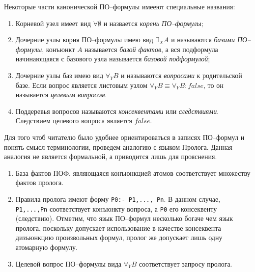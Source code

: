 Некоторые части канонической ПО--формулы имееют специальные названия:
\begin{enumerate}
\item Корневой узел имеет вид $\forall \emptyset$ и назвается {\em корень ПО--формулы}; 

\item Дочерние узлы корня ПО--формулы имею вид $\exists_XA$ и называются {\em базами ПО--формулы}, конъюнкт $A$ называется {\em базой фактов}, а вся подформула начинающаяся с базового узла называется {\em базовой подформулой};

\item Дочерние узлы баз имею вид $\forall_YB$ и называются {\em вопросами} к родительской базе. Если вопрос является листовым узлом $\forall_YB \equiv \forall_YB\colon false$, то он называется {\em целевым вопросом}. %

\item Поддеревья вопросов называются {\em консеквентами} или {\em следствиями}. Следствием целевого вопроса является $false$. 

\end{enumerate}


Для того чтоб читателю было удобнее ориентироваться в записях ПО--формул и понять смысл терминологии, проведем аналогию с языком Пролога. Данная аналогия не является формальной, а приводится лишь для прояснения.

\begin{enumerate} 
\item База фактов ПОФ, являющаяся конъюнкцией атомов соответствует множеству фактов пролога.
\item Правила пролога имеют форму \texttt{P0:- P1,..., Pn}. В данном случае, \texttt{P1,...,Pn} соответствует конъюнкту вопроса, а \texttt{P0} его консеквенту (следствию). Отметим, что язык ПО--формул несколько богаче чем язык пролога, поскольку допускает использование в качестве консеквента дизъюнкцию произвольных формул, пролог же допускает лишь одну атомарную формулу.
\item Целевой вопрос ПО--формулы вида $\forall_YB$ соответствует запросу пролога. 
\end{enumerate}

